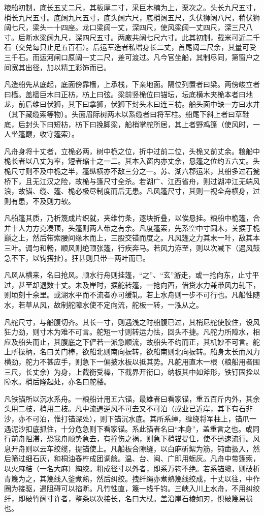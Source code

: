 \documentclass[12pt,UTF8]{ctexbook}
\begin{document}
粮船初制，底长五丈二尺，其板厚二寸，采巨木楠为上，栗次之。头长九尺五寸，梢长九尺五寸。底阔九尺五寸，底头阔六尺，底梢阔五尺，头伏狮阔八尺，稍伏狮阔七尺，梁头一十四座。龙口梁阔一丈，深四尺，使风梁阔一丈四尺，深三尺八寸。后断水梁阔九尺，深四尺五寸。两廒共阔七尺六寸。此其初制，载米可近二千石（交兑每只止足五百石）。后运军造者私增身长二丈，首尾阔二尺余，其量可受三千石。而运河闸口原阔一丈二尺，差可渡过。凡今官坐船，其制尽同，第窗户之间宽其出径，加以精工彩饰而已。

凡造船先从底起，底面傍靠樯，上承栈，下亲地面。隔位列置者曰梁。两傍峻立者曰樯。盖樯巨木曰正枋，枋上曰弦。梁前竖桅位曰锚坛，坛底横木夹桅本者曰地龙，前后维曰伏狮，其下曰拿狮，伏狮下封头木曰连三枋。船头面中缺一方曰水井（其下藏缆索等物）。头面眉际树两木以系缆者曰将军柱。船尾下斜上者曰草鞋底，后封头下曰短枋，枋下曰挽脚梁，船梢掌舵所居，其上者野鸡篷（使风时，一人坐篷巅，收守篷索）。

凡舟身将十丈者，立桅必两，树中桅之位，折中过前二位，头桅又前丈余。粮船中桅长者以八丈为率，短者缩十之一二。其本入窗内亦丈余，悬篷之位约五六丈。头桅尺寸则不及中桅之半，篷纵横亦不敌三分之一。苏、湖六郡运米，其船多过石瓮桥下，且无江汉之险，故桅与篷尺寸全杀。若湖广、江西省舟，则过湖冲江无端风浪，故锚、缆、篷、桅必极尽制度而后无患。凡风篷尺寸，其则一视全舟横身，过则有患，不及则力软。

凡船篷其质，乃析篾成片织就，夹维竹条，逐块折叠，以俟悬挂。粮船中桅篷，合并十人力方克凑顶，头篷则两人带之有余。凡度篷索，先系空中寸圆木，关捩于桅巅之上，然后带索腰间缘木而上，三股交错而度之。凡风篷之力其末一叶，敌其本三叶。调匀和畅，顺风则绝顶张篷，行疾奔马。若风力洊至，则以次减下（遇风鼓急不下，以钩搭扯）。狂甚则只带一两叶而已。

凡风从横来，名曰抢风。顺水行舟则挂篷，“之”、“玄”游走，或一抢向东，止寸平过，甚至却退数十丈。未及岸时，捩舵转篷，一抢向西，借贷水力兼带风力轧下，则顷刻十余里。或湖水平而不流者亦可缓轧。若上水舟则一步不可行也。凡船性随水，若草从风，故制舵障水使不定向流，舵板一转，一泓从之。

凡舵尺寸，与船腹切齐。其长一寸，则遇浅之时船腹已过，其梢尼舵使胶住，设风狂力劲，则寸木为难不可言。舵短一寸则转运力怯，回头不捷。凡舵力所障水，相应及船头而止，其腹底之下俨若一派急顺流，故船头不约而正，其机妙不可言。舵上所操柄，名曰关门棒，欲船北则南向捩转，欲船南则北向捩转。船身太长而风力横劲，舵力不甚应手，则急下一偏披水板以抵其势。凡舵用直木一根（粮船用者围三尺，长丈余）为身，上截衡受棒，下截界开衔口，纳板其中如斧形，铁钉固拴以障水。梢后隆起处，亦名曰舵楼。

凡铁锚所以沉水系舟。一粮船计用五六锚，最雄者曰看家锚，重五百斤内外，其余头用二枝，梢用二枝。凡中流遇逆风不可去又不可泊（或业已近岸，其下有石非沙，亦不可泊，惟打锚深处），则下锚沉水底。其所系绰，缠绕将军柱上，锚爪一遇泥沙扣底抓住，十分危急则下看家锚。系此锚者名曰“本身”，盖重言之也。或同行前舟阻滞，恐我舟顺势急去，有撞伤之祸，则急下梢锚提住，使不迅速流行。风息开舟则以云车绞缆，提锚使上。凡船板合隙缝，以白麻斫絮为筋，钝凿扱入，然后筛过细石灰，和桐油舂杵成团调艌。温、台、闽、广即用蛎灰。凡舟中带篷索，以火麻秸（一名大麻）綯绞。粗成径寸以外者，即系万钧不绝。若系锚缆，则破析青篾为之，其篾线入釜煮熟，然后纠绞。拽纤绳亦煮熟篾线绞成，十丈以往，中作圈为接驱，遇阻碍可以掐断。凡竹性直，篾一线千钧。三峡入川上水舟，不用纠绞纤，即破竹阔寸许者，整条以次接长，名曰大杖。盖沿崖石棱如刃，惧破篾易损也。
\end{document}
